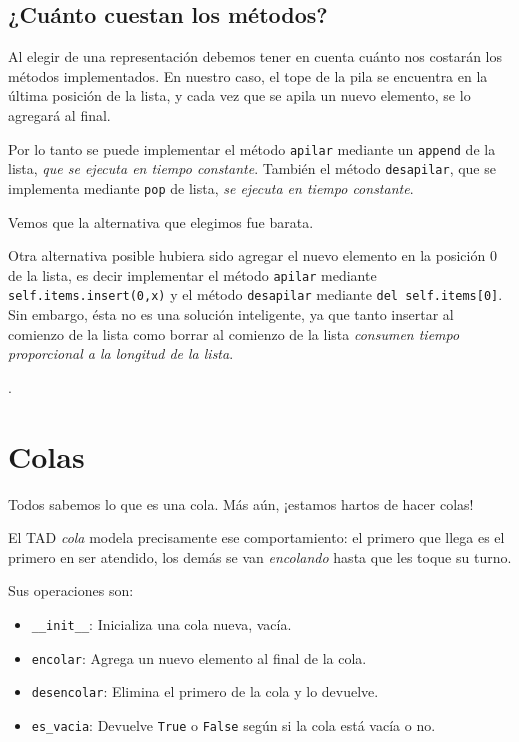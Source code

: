 \subsection{¿Cuánto cuestan los métodos?}

Al elegir de una representación debemos tener en cuenta cuánto nos costarán
los métodos implementados. En nuestro caso, el tope de la pila se encuentra
en la última posición de la lista, y cada vez que se apila un nuevo
elemento, se lo agregará al final.

Por lo tanto se puede implementar el método \lstinline!apilar! mediante un
\lstinline!append!  de la lista, {\it que se ejecuta en tiempo constante}.
También el método \lstinline!desapilar!, que se implementa mediante
\lstinline!pop! de lista, {\it se ejecuta en tiempo constante}.

Vemos que la alternativa que elegimos fue barata.

Otra alternativa posible hubiera sido agregar el nuevo elemento en la
posición $0$ de la lista, es decir implementar el método \lstinline!apilar!
mediante \lstinline|self.items.insert(0,x)| y el método
\lstinline!desapilar! mediante \lstinline|del self.items[0]|. Sin embargo,
ésta no es una solución inteligente, ya que tanto insertar al comienzo de
la lista como borrar al comienzo de la lista {\it consumen tiempo
proporcional a la longitud de la lista}.

.


\section{Colas}
Todos sabemos lo que es una cola. Más aún, ¡estamos hartos de hacer colas!

El TAD {\it cola} modela precisamente ese comportamiento: el primero que llega
es el primero en ser atendido, los demás se van {\it encolando} hasta que
les toque su turno.

Sus operaciones son:

\begin{itemize}

\item \lstinline+__init__+: Inicializa una cola nueva, vacía.

\item \lstinline!encolar!: Agrega un nuevo elemento al final de la cola.

\item \lstinline!desencolar!: Elimina el primero de la cola y lo devuelve.

\item \lstinline!es_vacia!: Devuelve \lstinline!True! o
\lstinline!False! según si la cola está vacía o no.

\end{itemize}

